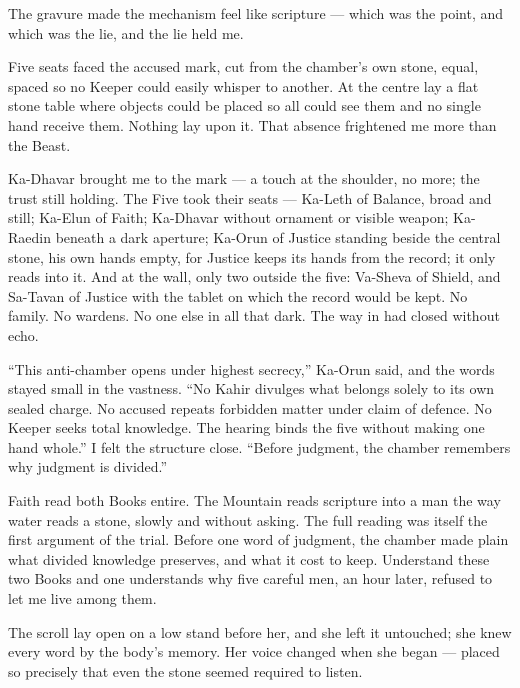 The gravure made the mechanism feel like scripture --- which was the point, and which was the lie, and the lie held me.\par
 
Five seats faced the accused mark, cut from the chamber's own stone, equal, spaced so no Keeper could easily whisper to another. At the centre lay a flat stone table where objects could be placed so all could see them and no single hand receive them. Nothing lay upon it. That absence frightened me more than the Beast.\par
 
Ka-Dhavar brought me to the mark --- a touch at the shoulder, no more; the trust still holding. The Five took their seats --- Ka-Leth of Balance, broad and still; Ka-Elun of Faith; Ka-Dhavar without ornament or visible weapon; Ka-Raedin beneath a dark aperture; Ka-Orun of Justice standing beside the central stone, his own hands empty, for Justice keeps its hands from the record; it only reads into it. And at the wall, only two outside the five: Va-Sheva of Shield, and Sa-Tavan of Justice with the tablet on which the record would be kept. No family. No wardens. No one else in all that dark. The way in had closed without echo.\par
 
``This anti-chamber opens under highest secrecy,'' Ka-Orun said, and the words stayed small in the vastness. ``No Kahir divulges what belongs solely to its own sealed charge. No accused repeats forbidden matter under claim of defence. No Keeper seeks total knowledge. The hearing binds the five without making one hand whole.'' I felt the structure close. ``Before judgment, the chamber remembers why judgment is divided.''\par
 
Faith read both Books entire. The Mountain reads scripture into a man the way water reads a stone, slowly and without asking. The full reading was itself the first argument of the trial. Before one word of judgment, the chamber made plain what divided knowledge preserves, and what it cost to keep. Understand these two Books and one understands why five careful men, an hour later, refused to let me live among them.\par
 
The scroll lay open on a low stand before her, and she left it untouched; she knew every word by the body's memory. Her voice changed when she began --- placed so precisely that even the stone seemed required to listen.\par
 
